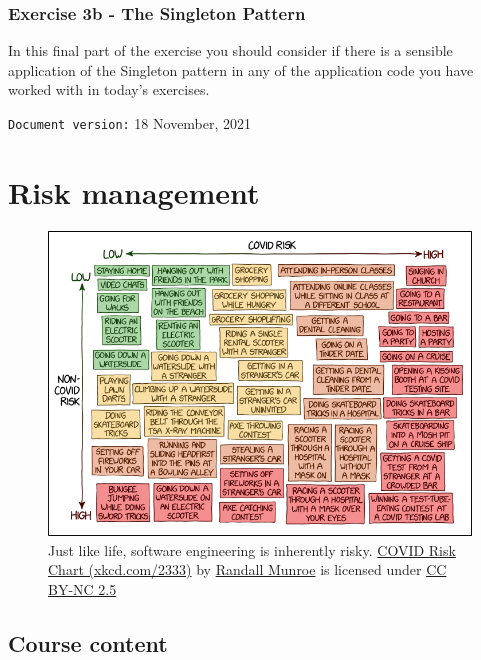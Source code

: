 \documentclass[
]{book}
\begin{document}
\hypertarget{singleton}{%
\subsection{Exercise 3b - The Singleton Pattern}\label{singleton}}

In this final part of the exercise you should consider if there is a sensible application of the Singleton pattern in any of the application code you have worked with in today's exercises.

\texttt{Document\ version:} 18 November, 2021

\hypertarget{risking}{%
\chapter{Risk management}\label{risking}}

\begin{figure}

{\centering \includegraphics[width=0.99\linewidth]{images/covid_risk_chart} 

}

\caption{Just like life, software engineering is inherently risky. \href{https://xkcd.com/2333/}{COVID Risk Chart (xkcd.com/2333)} by \href{https://en.wikipedia.org/wiki/Randall_Munroe}{Randall Munroe} is licensed under \href{https://creativecommons.org/licenses/by-nc/2.5/}{CC BY-NC 2.5}}\label{fig:xkcd-risk-fig}
\end{figure}



\hypertarget{course-content-2}{%
\section{Course content}\label{course-content-2}}
\end{document}
